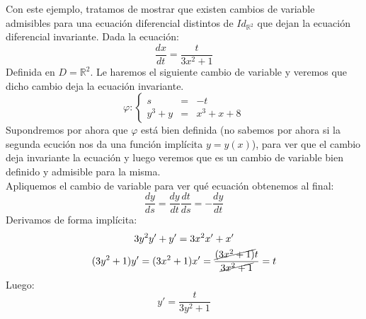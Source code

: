 \begin{ejemplo}
    Con este ejemplo, tratamos de mostrar que existen cambios de variable admisibles para una ecuación diferencial distintos de $Id_{\mathbb{R}^2}$ que dejan la ecuación diferencial invariante. Dada la ecuación:
    \begin{equation*}
        \dfrac{dx}{dt} = \dfrac{t}{3x^2+1}
    \end{equation*}
    Definida en $D=\mathbb{R}^2$. Le haremos el siguiente cambio de variable y veremos que dicho cambio deja la ecuación invariante.
    \begin{equation*}
        \varphi: \left\{\begin{array}{rcl}
                s &= &-t \\
                y^3 + y &= &x^3+x+8
        \end{array}\right.
    \end{equation*}
    Supondremos por ahora que $\varphi$ está bien definida (no sabemos por ahora si la segunda ecución nos da una función implícita $y=y(x)$), para ver que el cambio deja invariante la ecuación y luego veremos que es un cambio de variable bien definido y admisible para la misma.\\

    Apliquemos el cambio de variable para ver qué ecuación obtenemos al final:
    \begin{equation*}
        \dfrac{dy}{ds} = \dfrac{dy}{dt} \dfrac{dt}{ds} = -\dfrac{dy}{dt} 
    \end{equation*}
    Derivamos de forma implícita:
    \begin{gather*}
        3y^2 y' + y' = 3x^2 x' + x' \\
        (3y^2 + 1)y' = (3x^2 + 1)x' = \dfrac{\cancel{(3x^2+1)}t}{\cancel{3x^2+1}} = t
    \end{gather*}
    Luego:
    \begin{equation*}
        y' = \dfrac{t}{3y^2 + 1}
    \end{equation*}


\end{ejemplo}
